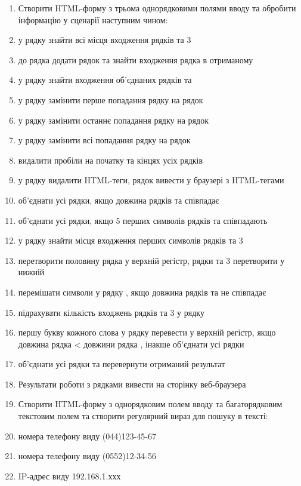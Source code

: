 \begin{enumerate}
\item[]Створити HTML-форму з трьома однорядковими полями вводу та обробити інформацію у сценарії наступним чином:
\item у рядку  знайти всі місця входження рядків \No{} та 3
\item до рядка  додати рядок  та знайти входження рядка  в отриманому
\item у рядку  знайти входження об'єднаних рядків  та 
\item у рядку  замінити перше попадання рядку  на рядок 
\item у рядку  замінити останнє попадання рядку  на рядок 
\item у рядку  замінити всі попадання рядку  на рядок 
\item видалити пробіли на початку та кінцях усіх рядків
\item у рядку  видалити HTML-теги, рядок  вивести у браузері з  HTML-тегами
\item об'єднати усі рядки, якщо довжина рядків  та  співпадає
\item об'єднати усі рядки, якщо 5 перших символів рядків  та  співпадають
\item у рядку  знайти місця входження перших символів рядків \No{} та 3
\item перетворити половину рядка  у верхній регістр, рядки \No{} та 3 перетворити у нижній
\item перемішати символи у рядку , якщо довжина рядків  та  не співпадає
\item підрахувати кількість входжень рядків \No{} та 3 у рядку  
\item першу букву кожного слова у рядку  перевести у верхній регістр, якщо довжина рядка  < довжини рядка , інакше об'єднати усі рядки
\item об'єднати усі рядки та перевернути отриманий результат
\item[]Результати роботи з рядками вивести на сторінку веб-браузера 
\item[]Створити HTML-форму з однорядковим полем вводу та багаторядковим текстовим полем та створити регулярний вираз для пошуку в тексті:
\item номера телефону виду (044)123-45-67
\item номера телефону виду (0552)12-34-56
\item IP-адрес виду 192.168.1.ххх

\end{enumerate}
